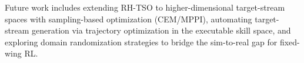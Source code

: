 \documentclass{article}
\begin{document}
Future work includes extending RH-TSO to higher-dimensional target-stream spaces with sampling-based optimization (CEM/MPPI), automating target-stream generation via trajectory optimization in the executable skill space, and exploring domain randomization strategies to bridge the sim-to-real gap for fixed-wing RL.


\clearpage
{}



\end{document}
